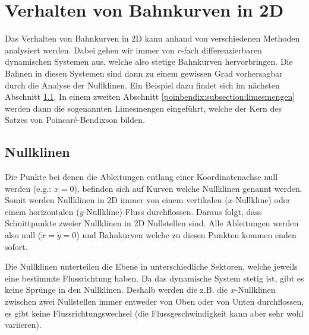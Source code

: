 \section{Verhalten von Bahnkurven in 2D} \label{poinbendix:section:nullklinen}

Das Verhalten von Bahnkurven in 2D kann anhand von verschiedenen Methoden analysiert werden.
Dabei gehen wir immer von $r$-fach differenzierbaren dynamischen Systemen aus, welche also stetige Bahnkurven hervorbringen.
Die Bahnen in diesen Systemen sind dann zu einem gewissen Grad vorhersagbar durch die Analyse der Nullklinen.
Ein Beispiel dazu findet sich im nächsten Abschnitt \ref{poinbendix:subsection:nullklinen}.
In einem zweiten Abschnitt \ref{poinbendix:subsection:limesmengen} werden dann die sogenannten Limesmengen eingeführt, welche der Kern des Satzes von Poincaré-Bendixson bilden.

\subsection{Nullklinen} \label{poinbendix:subsection:nullklinen}

Die Punkte bei denen die Ableitungen entlang einer Koordinatenachse null werden (e.g.: $\dot{x}=0$), befinden sich auf Kurven welche Nullklinen genannt werden. %
Somit werden Nullklinen in 2D immer von einem vertikalen ($x$-Nullkline) oder einem horizontalen ($y$-Nullkline) Fluss durchflossen.
Daraus folgt, dass Schnittpunkte zweier Nullklinen in 2D Nullstellen sind.
Alle Ableitungen werden also null ($\dot{x}=\dot{y}=0$) und Bahnkurven welche zu diesen Punkten kommen enden sofort.

Die Nullklinen unterteilen die Ebene in unterschiedliche Sektoren, welche jeweils eine bestimmte Flussrichtung haben.
Da das dynamische System stetig ist, gibt es keine Sprünge in den Nullklinen.
Deshalb werden die z.B. die $x$-Nullklinen zwischen zwei Nullstellen immer entweder von Oben oder von Unten durchflossen, es gibt keine Flussrichtungswechsel (die Flussgeschwindigkeit kann aber sehr wohl variieren).

